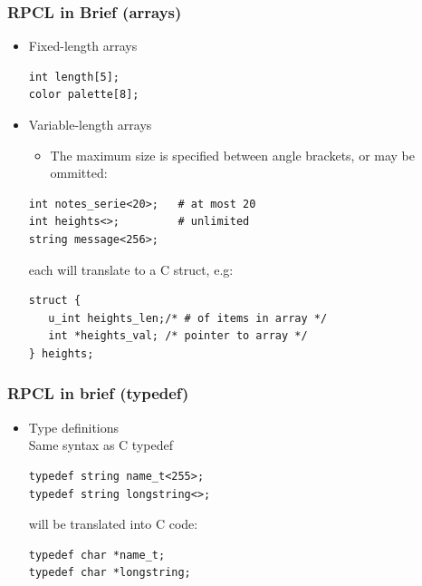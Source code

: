 \documentclass[bigger,hyperref={colorlinks=true, urlcolor=red, plainpages=false, pdfpagelabels, bookmarksnumbered}]{beamer}
\begin{document}
\begin{frame}[fragile]
\frametitle{RPCL in Brief (arrays)}
\label{sec-2-17}
\begin{itemize}

\item Fixed-length arrays\\
\label{sec-2-17-1}%
\lstset{language=C}
\begin{lstlisting}
int length[5];
color palette[8];
\end{lstlisting}


\item Variable-length arrays
\label{sec-2-17-2}%
\begin{itemize}
\item The maximum size is specified between angle brackets, or may be ommitted:
\end{itemize}

\lstset{language=C}
\begin{lstlisting}
int notes_serie<20>;   # at most 20
int heights<>;         # unlimited
string message<256>;
\end{lstlisting}
each will translate to a C struct, e.g:

\lstset{language=C}
\begin{lstlisting}
struct {
   u_int heights_len;/* # of items in array */
   int *heights_val; /* pointer to array */
} heights;
\end{lstlisting}
\end{itemize} %
\end{frame}
\begin{frame}[fragile]
\frametitle{RPCL in brief (typedef)}
\label{sec-2-18}
\begin{itemize}

\item Type definitions\\
\label{sec-2-18-1}%
Same syntax as C typedef

\lstset{language=C}
\begin{lstlisting}
typedef string name_t<255>; 
typedef string longstring<>;
\end{lstlisting}
will be translated into C code:

\lstset{language=C}
\begin{lstlisting}
typedef char *name_t;
typedef char *longstring;
\end{lstlisting}

\end{itemize} %
\end{frame}
\end{document}
